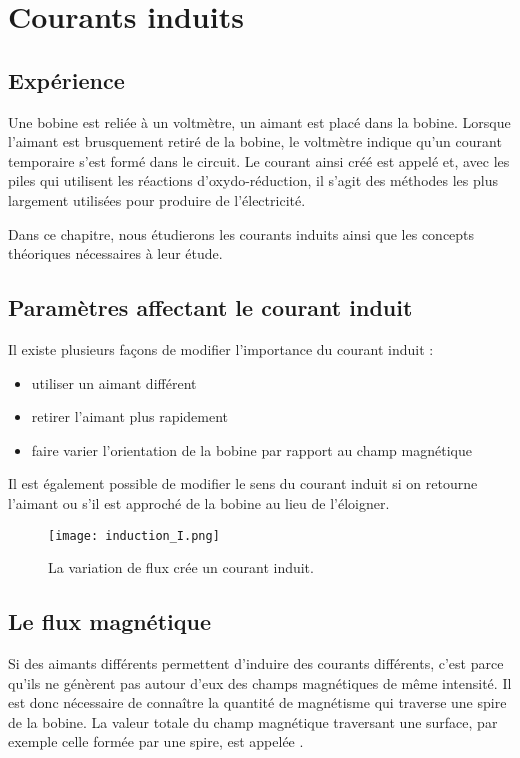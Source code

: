 \chapter{Courants induits}
\section{Expérience}
Une bobine est reliée à un voltmètre, un aimant est placé dans la bobine. Lorsque l'aimant est brusquement retiré de la bobine, le voltmètre indique qu'un courant temporaire s'est formé dans le circuit. Le courant ainsi créé est appelé  et, avec les piles qui utilisent les réactions d'oxydo-réduction, il s'agit des méthodes les plus largement utilisées pour produire de l'électricité.

Dans ce chapitre, nous étudierons les courants induits ainsi que les concepts théoriques nécessaires à leur étude.

\section{Paramètres affectant le courant induit}
Il existe plusieurs façons de modifier l'importance du courant induit :
\begin{itemize}[label=\textbullet]
    \item utiliser un aimant différent
    \item retirer l'aimant plus rapidement
    \item faire varier l'orientation de la bobine par rapport au champ magnétique
\end{itemize}

Il est également possible de modifier le sens du courant induit si on retourne l'aimant ou s'il est approché de la bobine au lieu de l'éloigner.
\begin{figure}[ht]
    \centering
    \texttt{[image: induction\_I.png]}
    \caption{La variation de flux crée un courant induit.}
    \label{induction_I}
\end{figure}

\section{Le flux magnétique}
Si des aimants différents permettent d'induire des courants différents, c'est parce qu'ils ne génèrent pas autour d'eux des champs magnétiques de même intensité. Il est donc nécessaire de connaître la quantité de magnétisme qui traverse une spire de la bobine.
La valeur totale du champ magnétique traversant une surface, par exemple celle formée par une spire, est appelée .

